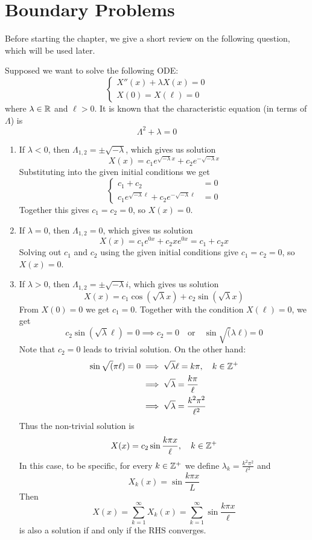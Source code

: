 \chapter{Boundary Problems}

Before starting the chapter, we give a short review on the following question, which will be used later.

Supposed we want to solve the following ODE:
\[\begin{cases}
    X''(x) + \lambda X(x) = 0\\
    X(0) = X(\ell) = 0
\end{cases}\]
where $\lambda\in {\mathbb R}$ and $\ell >0$. It is known that the characteristic equation (in terms of $\Lambda$) is
\[\Lambda^2 + \lambda = 0\]
\begin{enumerate}
    \item If $\lambda<0$, then $\Lambda_{1,2} = \pm \sqrt{-\lambda}$, which gives us solution 
    \[X(x) = c_1 e^{\sqrt{-\lambda}x} + c_2 e^{-\sqrt{-\lambda}x}\] 
    Substituting into the given initial conditions we get  
    \[\begin{cases}
        c_1 + c_2 &= 0\\
        c_1 e^{\sqrt{-\lambda}\ell} + c_2 e^{-\sqrt{-\lambda}\ell} &= 0
    \end{cases}\]
    Together this gives $c_1 = c_2 = 0$, so $X(x) = 0$.
    \item If $\lambda = 0$, then $\Lambda_{1,2} = 0$, which gives us solution 
    \[X(x) = c_1 e^{0x} + c_2 xe^{0x} = c_1 + c_2x\]
    Solving out $c_1$ and $c_2$ using the given initial conditions give $c_1 = c_2 = 0$, so $X(x) = 0$.
    \item If $\lambda >0$, then $\Lambda_{1,2} = \pm \sqrt{-\lambda}i$, which gives us solution 
    \[X(x) = c_1 \cos(\sqrt{\lambda}x) + c_2 \sin(\sqrt{\lambda}x)\]
    From $X(0) = 0$ we get $c_1= 0$. Together with the condition $X(\ell) = 0$, we get 
    \[c_2 \sin(\sqrt{\lambda} \ell) = 0\implies c_2 = 0\quad \text{or} \quad \sin\sqrt({\lambda}\ell) = 0\]
    Note that $c_2 = 0$ leads to trivial solution. On the other hand:
    \begin{align*}
        \sin \sqrt({\pi} \ell) = 0 
        &\implies \sqrt{\lambda}\ell = k\pi,\quad k \in {\mathbb Z}^+ \\
        &\implies \sqrt\lambda = \frac{k\pi}{\ell}\\
        &\implies \sqrt\lambda = \frac{k^2\pi^2}{\ell^2}
    \end{align*}
    Thus the non-trivial solution is 
    \[X(x) = c_2 \sin\frac{k\pi x}{\ell},\quad k\in {\mathbb Z}^+\]
    In this case, to be specific, for every $k\in {\mathbb Z}^+$ we define $\lambda_k = \frac{k^2\pi^2}{\ell^2}$ and 
    \[X_k (x) = \sin \frac{k\pi x}{L}\]
    Then 
    \[X(x) = \sum_{k=1}^\infty X_k(x) = \sum_{k=1}^\infty \sin\frac{k\pi x}{\ell}\]
    is also a solution if and only if the RHS converges.
\end{enumerate}

